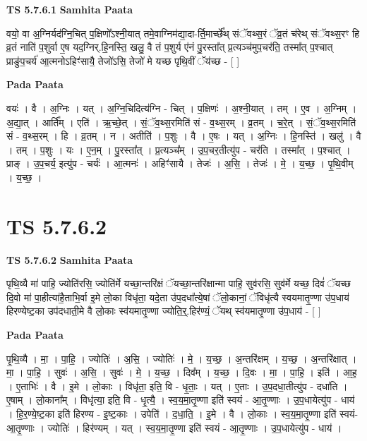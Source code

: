 \documentclass[17pt]{extarticle}
\begin{document}
\textbf{TS 5.7.6.1 } \newline
\textbf{Samhita Paata} \newline

वयो॒ वा अ॒ग्निर्यद॑ग्नि॒चित् प॒क्षिणो᳚ऽश्नी॒यात् तमे॒वाग्निम॑द्या॒दा-र्ति॒मार्च्छे᳚थ् संॅवथ्स॒रं ॅव्र॒तं च॑रेथ् संॅवथ्स॒रꣳ हि व्र॒तं नाति॑ प॒शुर्वा ए॒ष यद॒ग्निर्.हि॒नस्ति॒ खलु॒ वै तं प॒शुर्य ए॑नं पु॒रस्ता᳚त् प्र॒त्यञ्च॑मुप॒चर॑ति॒ तस्मा᳚त् प॒श्चात् प्राङु॑प॒चर्य॑ आ॒त्मनोऽहिꣳ॑सायै॒ तेजो॑ऽसि॒ तेजो॑ मे यच्छ पृथि॒वीं ॅय॑च्छ - [  ] \newline

\textbf{Pada Paata} \newline

वयः॑ । वै । अ॒ग्निः । यत् । अ॒ग्नि॒चिदित्य॑ग्नि - चित् । प॒क्षिणः॑ । अ॒श्नी॒यात् । तम् । ए॒व । अ॒ग्निम् । अ॒द्या॒त् । आर्ति᳚म् । एति॑ । ऋ॒च्छे॒त् । सं॒ॅव॒थ्स॒रमिति॑ सं - व॒थ्स॒रम् । व्र॒तम् । च॒रे॒त् । सं॒ॅव॒थ्स॒रमिति॑ सं - व॒थ्स॒रम् । हि । व्र॒तम् । न । अतीति॑ । प॒शुः । वै । ए॒षः । यत् । अ॒ग्निः । हि॒नस्ति॑ । खलु॑ । वै । तम् । प॒शुः । यः । ए॒न॒म् । पु॒रस्ता᳚त् । प्र॒त्यञ्च᳚म् । उ॒प॒चर॒तीत्यु॑प - चर॑ति । तस्मा᳚त् । प॒श्चात् । प्राङ् । उ॒प॒चर्य॒ इत्यु॑प - चर्यः॑ । आ॒त्मनः॑ । अहिꣳ॑सायै । तेजः॑ । अ॒सि॒ । तेजः॑ । मे॒ । य॒च्छ॒ । पृ॒थि॒वीम् । य॒च्छ॒ ।  \newline





\section{ TS 5.7.6.2 }

\textbf{TS 5.7.6.2 } \newline
\textbf{Samhita Paata} \newline

पृथि॒व्यै मा॑ पाहि॒ ज्योति॑रसि॒ ज्योति॑र्मे यच्छा॒न्तरि॑क्षं ॅयच्छा॒न्तरि॑क्षान्मा पाहि॒ सुव॑रसि॒ सुव॑र्मे यच्छ॒ दिवं॑ ॅयच्छ दि॒वो मा॑ पा॒हीत्या॑है॒ताभि॒र्वा इ॒मे लो॒का विधृ॑ता॒ यदे॒ता उ॑प॒दधा᳚त्ये॒षां ॅलो॒कानां॒ ॅविधृ॑त्यै स्वयमातृ॒ण्णा उ॑प॒धाय॑ हिरण्येष्ट॒का उप॑दधाती॒मे वै लो॒काः स्व॑यमातृ॒ण्णा ज्योति॒र्॒.हिर॑ण्यं॒ ॅयथ् स्व॑यमातृ॒ण्णा उ॑प॒धाय॑ - [  ] \newline

\textbf{Pada Paata} \newline

पृ॒थि॒व्यै । मा॒ । पा॒हि॒ । ज्योतिः॑ । अ॒सि॒ । ज्योतिः॑ । मे॒ । य॒च्छ॒ । अ॒न्तरि॑क्षम् । य॒च्छ॒ । अ॒न्तरि॑क्षात् । मा॒ । पा॒हि॒ । सुवः॑ । अ॒सि॒ । सुवः॑ । मे॒ । य॒च्छ॒ । दिव᳚म् । य॒च्छ॒ । दि॒वः । मा॒ । पा॒हि॒ । इति॑ । आ॒ह॒ । ए॒ताभिः॑ । वै । इ॒मे । लो॒काः । विधृ॑ता॒ इति॒ वि - धृ॒ताः॒ । यत् । ए॒ताः । उ॒प॒दधा॒तीत्यु॑प - दधा॑ति । ए॒षाम् । लो॒काना᳚म् । विधृ॑त्या॒ इति॒ वि - धृ॒त्यै॒ । स्व॒य॒मा॒तृ॒ण्णा इति॑ स्वयं - आ॒तृ॒ण्णाः । उ॒प॒धायेत्यु॑प - धाय॑ । हि॒र॒ण्ये॒ष्ट॒का इति॑ हिरण्य - इ॒ष्ट॒काः । उपेति॑ । द॒धा॒ति॒ । इ॒मे । वै । लो॒काः । स्व॒य॒मा॒तृ॒ण्णा इति॑ स्वयं-आ॒तृ॒ण्णाः । ज्योतिः॑ । हिर॑ण्यम् । यत् । स्व॒य॒मा॒तृ॒ण्णा इति॑ स्वयं - आ॒तृ॒ण्णाः । उ॒प॒धायेत्यु॑प - धाय॑ ।  \newline
\end{document}
